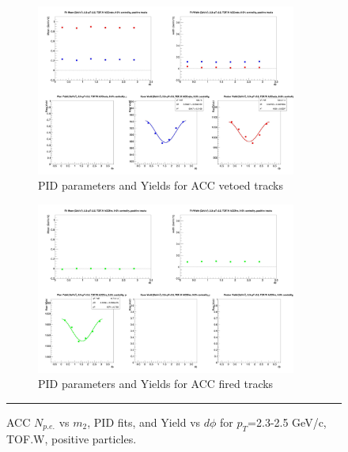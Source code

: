 \begin{figure}[H]
  \ContinuedFloat
    \begin{subfigure}{1\textwidth}
   \centering
   \includegraphics[width=0.94\textwidth]{hiptfits/pos/fitParams_tof2_cent0_ch1_pT-23-25.jpg}
    \caption{PID parameters and Yields for ACC vetoed tracks}
    \end{subfigure}    
    \begin{subfigure}{1\textwidth}
   \centering
   \includegraphics[width=0.94\textwidth]{hiptfits/pos/fitParams_tof3_cent0_ch1_pT-23-25.jpg}
    \caption{PID parameters and Yields for ACC fired tracks}
    \end{subfigure} 
    \rule{35em}{0.5pt}
  \caption[ACC $N_{p.e.}$ vs $m_2$, PID fits, and Yield vs $d\phi$ for $p_T$=2.3-2.5 GeV/c, TOF.W, positive particles.]{ACC $N_{p.e.}$ vs $m_2$, PID fits, and Yield vs $d\phi$ for $p_T$=2.3-2.5 GeV/c, TOF.W, positive particles.}
  \label{fig:acc23-25pos}
\end{figure}


